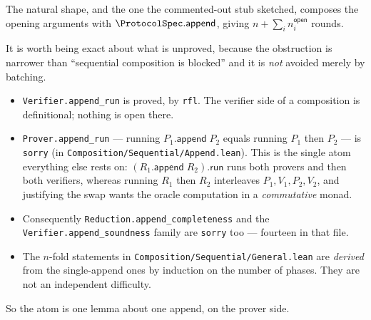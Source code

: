 \begin{remark}
    \label{rem:bcs_sequential_blocked}
    The natural shape, and the one the commented-out stub sketched, composes the opening arguments
    with $\ProtocolSpec.\mathsf{append}$, giving $n + \sum_i n^{\mathsf{open}}_i$ rounds.

    It is worth being exact about what is unproved, because the obstruction is narrower than
    ``sequential composition is blocked'' and it is \emph{not} avoided merely by batching.

    \begin{itemize}
        \item \texttt{Verifier.append\_run} is proved, by \texttt{rfl}. The verifier side of a
            composition is definitional; nothing is open there.
        \item \texttt{Prover.append\_run} --- running $P_1.\mathsf{append}\;P_2$ equals running
            $P_1$ then $P_2$ --- is \texttt{sorry} (in
            \texttt{Composition/\allowbreak Sequential/\allowbreak Append.lean}). This is the
            single atom everything else rests on: $(R_1.\mathsf{append}\;R_2).\mathsf{run}$ runs both provers and then
            both verifiers, whereas running $R_1$ then $R_2$ interleaves
            $P_1, V_1, P_2, V_2$, and justifying the swap wants the oracle computation in a
            \emph{commutative} monad.
        \item Consequently \texttt{Reduction.append\_completeness} and the
            \texttt{Verifier.append\_soundness} family are \texttt{sorry} too --- fourteen in
            that file.
        \item The $n$-fold statements in
            \texttt{Composition/\allowbreak Sequential/\allowbreak General.lean} are
            \emph{derived} from the single-append ones by induction on the number of phases. They
            are not an independent difficulty.
    \end{itemize}

    So the atom is one lemma about one append, on the prover side.
\end{remark}


